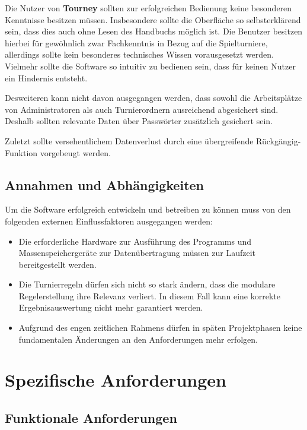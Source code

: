 \documentclass[11pt]{article}
\begin{document}
Die Nutzer von \textbf{Tourney} sollten zur erfolgreichen Bedienung keine besonderen Kenntnisse besitzen müssen. Insbesondere sollte die Oberfläche so selbsterklärend sein, dass dies auch ohne Lesen des Handbuchs möglich ist. Die Benutzer besitzen hierbei für gewöhnlich zwar Fachkenntnis in Bezug auf die Spielturniere, allerdings sollte kein besonderes technisches Wissen vorausgesetzt werden. Vielmehr sollte die Software so intuitiv zu bedienen sein, dass für keinen Nutzer ein Hindernis entsteht.

Desweiteren kann nicht davon ausgegangen werden, dass sowohl die Arbeitsplätze von Administratoren als auch Turnierordnern ausreichend abgesichert sind. Deshalb sollten relevante Daten über Passwörter zusätzlich gesichert sein.

Zuletzt sollte versehentlichem Datenverlust durch eine übergreifende Rückgängig-Funktion vorgebeugt werden.

\subsection{Annahmen und Abhängigkeiten}

Um die Software erfolgreich entwickeln und betreiben zu können muss von den folgenden externen Einflussfaktoren ausgegangen werden:
\begin{itemize}
	\item Die erforderliche Hardware zur Ausführung des Programms und Massenspeichergeräte zur Datenübertragung müssen zur Laufzeit bereitgestellt werden.
	\item Die Turnierregeln dürfen sich nicht so stark ändern, dass die modulare Regelerstellung ihre Relevanz verliert. In diesem Fall kann eine korrekte Ergebnisauswertung nicht mehr garantiert werden.
	\item Aufgrund des engen zeitlichen Rahmens dürfen in späten Projektphasen keine fundamentalen Änderungen an den Anforderungen mehr erfolgen.
\end{itemize}

\newpage

\section{Spezifische Anforderungen}

\subsection{Funktionale Anforderungen}
\end{document}
